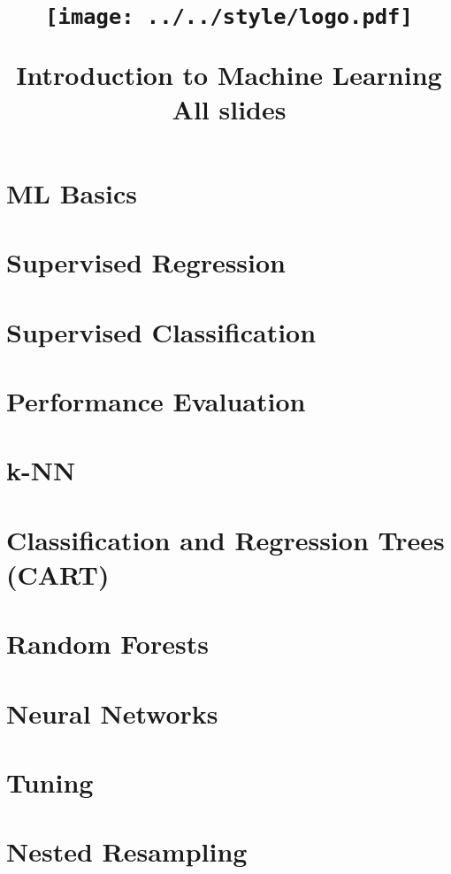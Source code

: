 \documentclass[11pt,compress]{beamer}
\title{
\centerline{\texttt{[image: ../../style/logo.pdf]}}
\medskip
Introduction to Machine Learning \\
\medskip
\small All slides
}
\begin{document}

\begin{frame}
\maketitle
\end{frame}



\section{ML Basics}


\section{Supervised Regression}


\section{Supervised Classification}


\section{Performance Evaluation}


\section{k-NN}


\section{Classification and Regression Trees (CART)}


\section{Random Forests}


\section{Neural Networks}


\section{Tuning}


\section{Nested Resampling}


%
\end{document}
